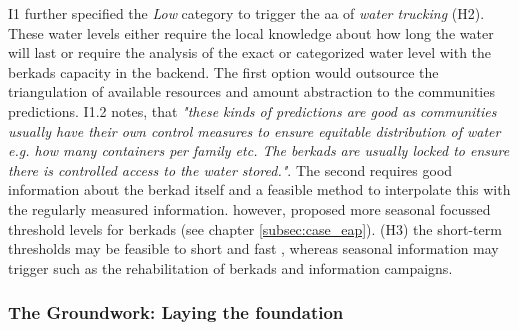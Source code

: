 I1 further specified the \textit{Low} category to trigger the \acrshort{aa} of \textit{water trucking} (H2). These water levels either require the local knowledge about how long the water will last or require the analysis of the exact or categorized water level with the berkads capacity in the backend. The first option would outsource the triangulation of available resources and amount abstraction to the communities predictions. I1.2 notes, that \textit{"these kinds of predictions are good as communities usually have their own control measures to ensure equitable distribution of water e.g. how many containers per family etc. The berkads are usually locked to ensure there is controlled access to the water stored."}. The second requires good information about the berkad itself and a feasible method to interpolate this with the regularly measured information. \autocite{gualazziniEWEAEarlyWarning2021} however, proposed more seasonal focussed threshold levels for berkads (see chapter \ref*{subsec:case_eap}). (H3) the short-term thresholds may be feasible to short and fast , whereas seasonal information may trigger  such as the rehabilitation of berkads and information campaigns.

\subsubsection{The Groundwork: Laying the foundation}

